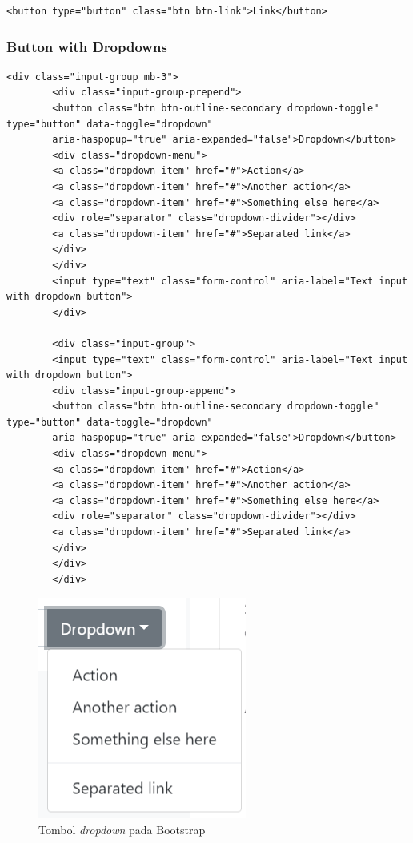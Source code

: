 \documentclass[a4paper,twoside]{article}
\begin{document}
\begin{enumerate}
\begin{lstlisting}[frame=single]
		<button type="button" class="btn btn-link">Link</button>
		\end{lstlisting}
		\subsubsection{Button with Dropdowns}
		\begin{lstlisting}[frame=single, basicstyle=\tiny]
		<div class="input-group mb-3">
		<div class="input-group-prepend">
		<button class="btn btn-outline-secondary dropdown-toggle" type="button" data-toggle="dropdown"
		aria-haspopup="true" aria-expanded="false">Dropdown</button>
		<div class="dropdown-menu">
		<a class="dropdown-item" href="#">Action</a>
		<a class="dropdown-item" href="#">Another action</a>
		<a class="dropdown-item" href="#">Something else here</a>
		<div role="separator" class="dropdown-divider"></div>
		<a class="dropdown-item" href="#">Separated link</a>
		</div>
		</div>
		<input type="text" class="form-control" aria-label="Text input with dropdown button">
		</div>
		
		<div class="input-group">
		<input type="text" class="form-control" aria-label="Text input with dropdown button">
		<div class="input-group-append">
		<button class="btn btn-outline-secondary dropdown-toggle" type="button" data-toggle="dropdown"
		aria-haspopup="true" aria-expanded="false">Dropdown</button>
		<div class="dropdown-menu">
		<a class="dropdown-item" href="#">Action</a>
		<a class="dropdown-item" href="#">Another action</a>
		<a class="dropdown-item" href="#">Something else here</a>
		<div role="separator" class="dropdown-divider"></div>
		<a class="dropdown-item" href="#">Separated link</a>
		</div>
		</div>
		</div>
		\end{lstlisting}
		
		\begin{figure} [H]
			\centering  
			\includegraphics[scale=1.0]{buttonsdropdown_bootstrap.PNG}  
			\caption{Tombol \textit{dropdown} pada Bootstrap} 
		\end{figure}
		

\end{enumerate}
\end{document}

